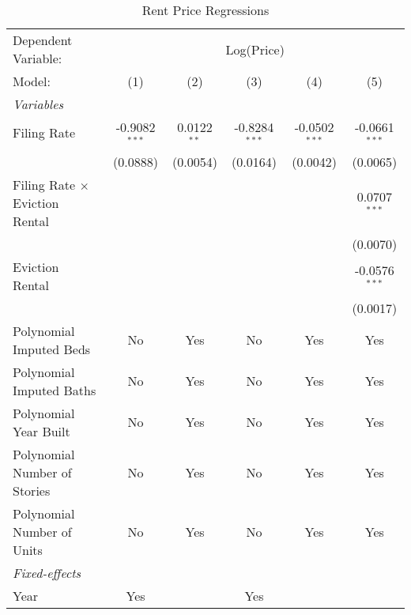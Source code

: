 \begin{table}[htbp]
   \caption{\label{tab:rent_regs} Rent Price Regressions}
   \centering
   \begin{tabular}{lccccc}
      \tabularnewline \midrule \midrule
      Dependent Variable: & \multicolumn{5}{c}{Log(Price)}\\
      Model:                                & (1)             & (2)           & (3)             & (4)             & (5)\\  
      \midrule
      \emph{Variables}\\
      Filing Rate                           & -0.9082$^{***}$ & 0.0122$^{**}$ & -0.8284$^{***}$ & -0.0502$^{***}$ & -0.0661$^{***}$\\   
                                            & (0.0888)        & (0.0054)      & (0.0164)        & (0.0042)        & (0.0065)\\   
      Filing Rate $\times$ Eviction Rental  &                 &               &                 &                 & 0.0707$^{***}$\\   
                                            &                 &               &                 &                 & (0.0070)\\   
      Eviction Rental                       &                 &               &                 &                 & -0.0576$^{***}$\\   
                                            &                 &               &                 &                 & (0.0017)\\   
      Polynomial Imputed Beds               & No              & Yes           & No              & Yes             & Yes\\  
      Polynomial Imputed Baths              & No              & Yes           & No              & Yes             & Yes\\  
      Polynomial Year Built                 & No              & Yes           & No              & Yes             & Yes\\  
      Polynomial Number of Stories          & No              & Yes           & No              & Yes             & Yes\\  
      Polynomial Number of Units            & No              & Yes           & No              & Yes             & Yes\\  
      \midrule
      \emph{Fixed-effects}\\
      Year                                  & Yes             &               & Yes             &                 & \\  

\end{tabular}
\end{table}
